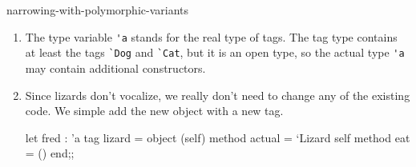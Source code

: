 \begin{exercise}{narrowing-with-polymorphic-variants}
\begin{answer}
\begin{enumerate}
\item The type variable \hbox{\lstinline/'a/} stands for the real type of tags.
The tag type contains at least the tags \hbox{\lstinline/`Dog/} and \hbox{\lstinline/`Cat/}, but it is an open
type, so the actual type \hbox{\lstinline/'a/} may contain additional constructors.

\item Since lizards don't vocalize, we really don't need to change any of the existing
code.  We simple add the new object with a new tag.

\begin{ocaml}
let fred : 'a tag lizard =
object (self)
   method actual = `Lizard self
   method eat = ()
end;;
\end{ocaml}
\end{enumerate}
\fi\end{answer}
\end{exercise}

